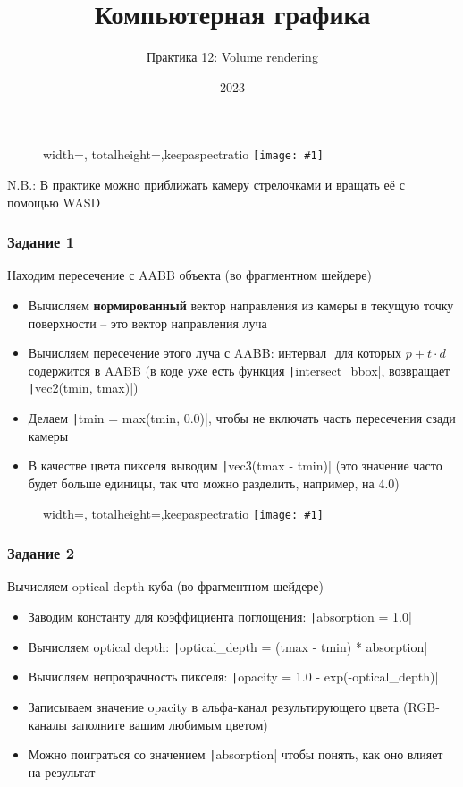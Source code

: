 \documentclass[10pt]{beamer}
\title{Компьютерная графика}
\subtitle{Практика 12: Volume rendering}
\date{2023}
\newcommand{\slideimage}[1]{
  \begin{figure}
    \begin{adjustbox}{width=\textwidth, totalheight=\textheight-2\baselineskip-2\baselineskip,keepaspectratio}
      \texttt{[image: \#1]}
    \end{adjustbox}
  \end{figure}
}
\begin{document}
\frame{\titlepage}

\begin{frame}[fragile]
\slideimage{0.png}
\end{frame}

\begin{frame}[fragile]
N.B.: В практике можно приближать камеру стрелочками и вращать её с помощью WASD
\end{frame}

\begin{frame}[fragile]
\frametitle{Задание 1}
Находим пересечение с AABB объекта (во фрагментном шейдере)
\begin{itemize}
\item Вычисляем \textbf{нормированный} вектор направления из камеры в текущую точку поверхности -- это вектор направления луча
\item Вычисляем пересечение этого луча с AABB: интервал \begin{math}[t_{min}, t_{max}]\end{math} для которых \begin{math}p + t \cdot d\end{math} содержится в AABB (в коде уже есть функция \texttt|intersect_bbox|, возвращает \texttt|vec2(tmin, tmax)|)
\item Делаем \texttt|tmin = max(tmin, 0.0)|, чтобы не включать часть пересечения сзади камеры
\item В качестве цвета пикселя выводим \texttt|vec3(tmax - tmin)| (это значение часто будет больше единицы, так что можно разделить, например, на 4.0)
\end{itemize}
\end{frame}

\begin{frame}[fragile]
\slideimage{1.png}
\end{frame}

\begin{frame}[fragile]
\frametitle{Задание 2}
Вычисляем optical depth куба (во фрагментном шейдере)
\begin{itemize}
\item Заводим константу для коэффициента поглощения: \texttt|absorption = 1.0|
\item Вычисляем optical depth: \texttt|optical_depth = (tmax - tmin) * absorption|
\item Вычисляем непрозрачность пикселя: \texttt|opacity = 1.0 - exp(-optical_depth)|
\item Записываем значение opacity в альфа-канал результирующего цвета (RGB-каналы заполните вашим любимым цветом)
\item Можно поиграться со значением \texttt|absorption| чтобы понять, как оно влияет на результат
\end{itemize}
\end{frame}
\end{document}
